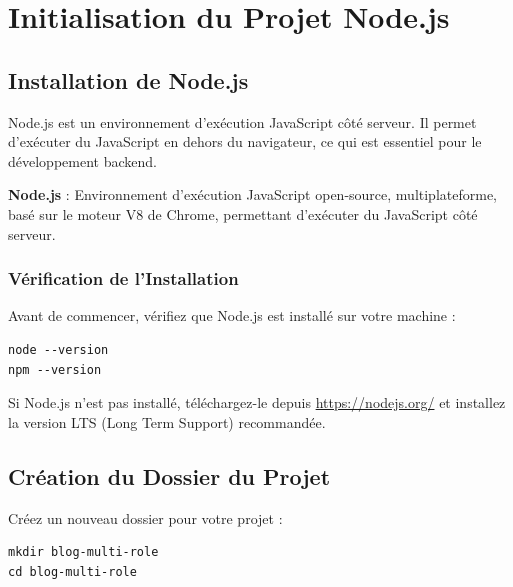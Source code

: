 \documentclass[a4paper,12pt]{book}
\begin{document}
\chapter{Initialisation du Projet Node.js}

\section{Installation de Node.js}

Node.js est un environnement d'exécution JavaScript côté serveur. Il permet d'exécuter du JavaScript en dehors du navigateur, ce qui est essentiel pour le développement backend.

\begin{definitionbox}
    \textbf{Node.js} : Environnement d'exécution JavaScript open-source, multiplateforme, basé sur le moteur V8 de Chrome, permettant d'exécuter du JavaScript côté serveur.
\end{definitionbox}

\subsection{Vérification de l'Installation}

Avant de commencer, vérifiez que Node.js est installé sur votre machine :

\begin{lstlisting}[style=bash, caption=Vérification de l'installation de Node.js]
node --version
npm --version
\end{lstlisting}

Si Node.js n'est pas installé, téléchargez-le depuis \url{https://nodejs.org/} et installez la version LTS (Long Term Support) recommandée.

\section{Création du Dossier du Projet}

Créez un nouveau dossier pour votre projet :

\begin{lstlisting}[style=bash, caption=Création du dossier du projet]
mkdir blog-multi-role
cd blog-multi-role
\end{lstlisting}
\end{document}
